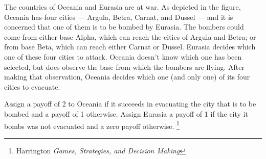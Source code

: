 \documentclass[addpoints]{exam}
\begin{document}
\begin{questions}

\newpage

\question
The countries of Oceania and Eurasia are at war.
As depicted in the figure, Oceania has four cities —
Argula, Betra, Carnat, and Dussel — 
and it is concerned that one of them is to be bombed by Eurasia.
The bombers could come from either base Alpha,
which can reach the cities of Argula and Betra;
or from base Beta, which can reach either Carnat or Dussel.
Eurasia decides which one of these four cities to attack.
Oceania doesn’t know which one has been selected,
but does observe the base from which the bombers are flying.
After making that observation, Oceania decides which one 
(and only one) of its four cities to evacuate.

Assign a payoff of 2 to Oceania
if it succeeds in evacuating the city that is to be bombed
and a payoff of 1 otherwise.
Assign Eurasia a payoff of 1 if the city it bombs was not evacuated
and a zero payoff otherwise.
\footnote{Harrington \textit{Games, Strategies, and Decision Making}}


\end{questions}
\end{document}
